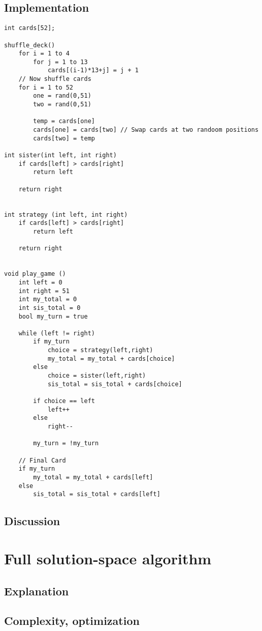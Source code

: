 \documentclass[11pt]{article}
\begin{document}
\subsection{Implementation}
\begin{lstlisting}
int cards[52];

shuffle_deck()
	for i = 1 to 4
		for j = 1 to 13
			cards[(i-1)*13+j] = j + 1
	// Now shuffle cards
	for i = 1 to 52
		one = rand(0,51)
		two = rand(0,51)

		temp = cards[one]
		cards[one] = cards[two] // Swap cards at two randoom positions
		cards[two] = temp

int sister(int left, int right)
	if cards[left] > cards[right]
		return left
	
	return right


int strategy (int left, int right)
	if cards[left] > cards[right]
		return left

	return right


void play_game ()
	int left = 0
	int right = 51
	int my_total = 0
	int sis_total = 0
	bool my_turn = true

	while (left != right)
		if my_turn
			choice = strategy(left,right)
			my_total = my_total + cards[choice]
		else
			choice = sister(left,right)
			sis_total = sis_total + cards[choice]

		if choice == left
			left++
		else
			right--

		my_turn = !my_turn

	// Final Card
	if my_turn
		my_total = my_total + cards[left]
	else
		sis_total = sis_total + cards[left]
\end{lstlisting}

\subsection{Discussion}

\section{Full solution-space algorithm}
\subsection{Explanation}
\subsection{Complexity, optimization}
\end{document}
